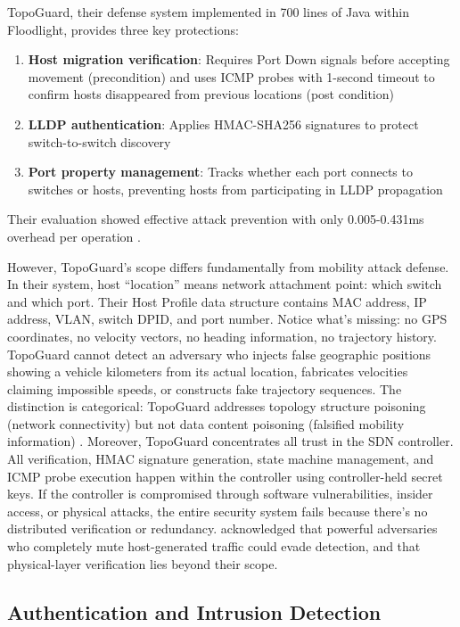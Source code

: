 \documentclass[12pt, a4paper]{report}
\begin{document}
TopoGuard, their defense system implemented in 700 lines of Java within Floodlight, provides three key protections:

\begin{enumerate}
	\item \textbf{Host migration verification}: Requires Port Down signals before accepting movement (precondition) and uses ICMP probes with 1-second timeout to confirm hosts disappeared from previous locations (post condition)
	\item \textbf{LLDP authentication}: Applies HMAC-SHA256 signatures to protect switch-to-switch discovery
	\item \textbf{Port property management}: Tracks whether each port connects to switches or hosts, preventing hosts from participating in LLDP propagation
\end{enumerate}

Their evaluation showed effective attack prevention with only 0.005-0.431ms overhead per operation \cite{hong2015}.

However, TopoGuard's scope differs fundamentally from mobility attack defense. In their system, host ``location'' means network attachment point: which switch and which port. Their Host Profile data structure contains MAC address, IP address, VLAN, switch DPID, and port number. Notice what's missing: no GPS coordinates, no velocity vectors, no heading information, no trajectory history. TopoGuard cannot detect an adversary who injects false geographic positions showing a vehicle kilometers from its actual location, fabricates velocities claiming impossible speeds, or constructs fake trajectory sequences. The distinction is categorical: TopoGuard addresses topology structure poisoning (network connectivity) but not data content poisoning (falsified mobility information) \cite{hong2015}.
\newline
Moreover, TopoGuard concentrates all trust in the SDN controller. All verification, HMAC signature generation, state machine management, and ICMP probe execution happen within the controller using controller-held secret keys. If the controller is compromised through software vulnerabilities, insider access, or physical attacks, the entire security system fails because there's no distributed verification or redundancy. \cite{hong2015} acknowledged that powerful adversaries who completely mute host-generated traffic could evade detection, and that physical-layer verification lies beyond their scope.

\subsection{Authentication and Intrusion Detection}
\label{subsec:authentication-ids}
\end{document}
